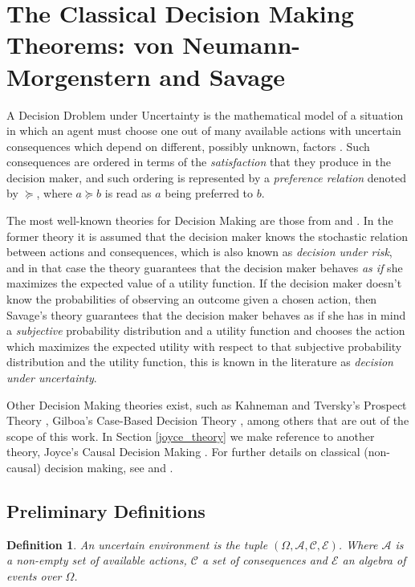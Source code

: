 \documentclass[review]{elsarticle}
\newtheorem{definition}[theorem]{Definition}
\begin{document}
\section{The Classical Decision Making Theorems: von Neumann-Morgenstern and Savage}
\label{classical_theorems}
A Decision Droblem under Uncertainty is the mathematical model of a situation in which an agent must choose one out of many available actions with uncertain consequences which depend on different, possibly unknown, factors \citep{bernardo2000bayesian,gilboa2009decision}. Such consequences are ordered in terms of the \textit{satisfaction} that they produce in the decision maker, and such ordering is represented by a \textit{preference relation} denoted by $\succeq$, where $a \succeq b$ is read as $a$ being preferred to $b$.

The most well-known theories for Decision Making are those from \cite{von1944theory} and \cite{savage1954the}. In the former theory it is assumed that the decision maker knows the stochastic relation between actions and consequences, which is also known as \textit{decision under risk}, and in that case the theory guarantees that the decision maker behaves \textit{as if} she maximizes the expected value of a utility function. If the decision maker doesn't know the probabilities of observing an outcome given a chosen action, then Savage's theory guarantees that the decision maker behaves as if she has in mind a \textit{subjective} probability distribution and a utility function and chooses the action which maximizes the expected utility with respect to that subjective probability distribution and the utility function, this is known in the literature as \textit{decision under uncertainty}.

Other Decision Making theories exist, such as Kahneman and Tversky's Prospect Theory \citep{kahneman1979prospect}, Gilboa's Case-Based Decision Theory \citep{gilboa1995case}, among others that are out of the scope of this work. In Section \ref{joyce_theory} we make reference to another theory, Joyce's Causal Decision Making \citep{joyce1999foundations}. For further details on classical (non-causal) decision making, see \cite{bernardo2000bayesian} and \cite{gilboa2009decision}.

\subsection{Preliminary Definitions}
\label{definitions}
\begin{definition}
An uncertain environment is the tuple $(\Omega, \mathcal{A},\mathcal{C},\mathcal{E})$. Where $\mathcal{A}$ is a non-empty set of available actions, $\mathcal{C}$ a set of consequences and $\mathcal{E}$ an algebra of events over $\Omega$. 
\end{definition}
\end{document}
